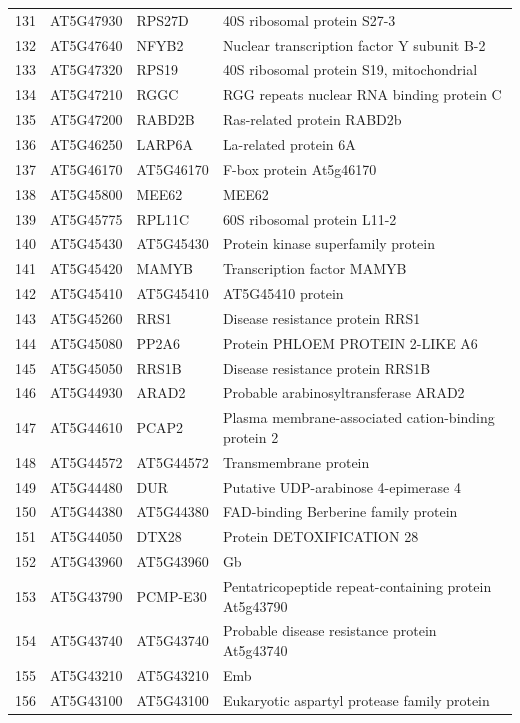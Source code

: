 \documentclass[11pt]{article}
\begin{document}
\begin{center}
\begin{tabular}{rlll}
131 & AT5G47930 & RPS27D & 40S ribosomal protein S27-3\\
132 & AT5G47640 & NFYB2 & Nuclear transcription factor Y subunit B-2\\
133 & AT5G47320 & RPS19 & 40S ribosomal protein S19, mitochondrial\\
134 & AT5G47210 & RGGC & RGG repeats nuclear RNA binding protein C\\
135 & AT5G47200 & RABD2B & Ras-related protein RABD2b\\
136 & AT5G46250 & LARP6A & La-related protein 6A\\
137 & AT5G46170 & AT5G46170 & F-box protein At5g46170\\
138 & AT5G45800 & MEE62 & MEE62\\
139 & AT5G45775 & RPL11C & 60S ribosomal protein L11-2\\
140 & AT5G45430 & AT5G45430 & Protein kinase superfamily protein\\
141 & AT5G45420 & MAMYB & Transcription factor MAMYB\\
142 & AT5G45410 & AT5G45410 & AT5G45410 protein\\
143 & AT5G45260 & RRS1 & Disease resistance protein RRS1\\
144 & AT5G45080 & PP2A6 & Protein PHLOEM PROTEIN 2-LIKE A6\\
145 & AT5G45050 & RRS1B & Disease resistance protein RRS1B\\
146 & AT5G44930 & ARAD2 & Probable arabinosyltransferase ARAD2\\
147 & AT5G44610 & PCAP2 & Plasma membrane-associated cation-binding protein 2\\
148 & AT5G44572 & AT5G44572 & Transmembrane protein\\
149 & AT5G44480 & DUR & Putative UDP-arabinose 4-epimerase 4\\
150 & AT5G44380 & AT5G44380 & FAD-binding Berberine family protein\\
151 & AT5G44050 & DTX28 & Protein DETOXIFICATION 28\\
152 & AT5G43960 & AT5G43960 & Gb\\
153 & AT5G43790 & PCMP-E30 & Pentatricopeptide repeat-containing protein At5g43790\\
154 & AT5G43740 & AT5G43740 & Probable disease resistance protein At5g43740\\
155 & AT5G43210 & AT5G43210 & Emb\\
156 & AT5G43100 & AT5G43100 & Eukaryotic aspartyl protease family protein\\

\end{tabular}
\end{center}
\end{document}
